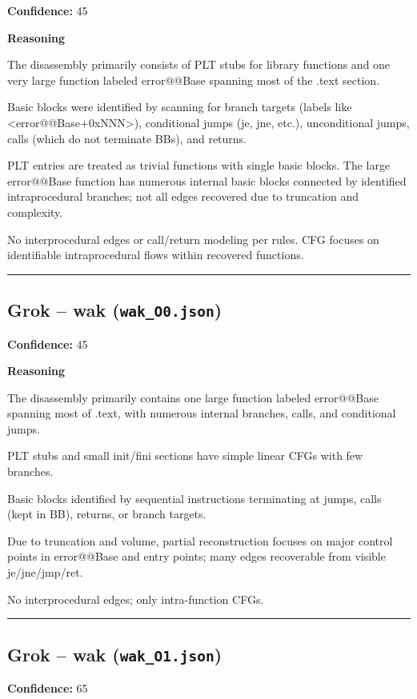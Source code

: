 \textbf{Confidence:} 45

\textbf{Reasoning}

The disassembly primarily consists of PLT stubs for library functions and one very large function labeled error@@Base spanning most of the .text section.

Basic blocks were identified by scanning for branch targets (labels like <error@@Base+0xNNN>), conditional jumps (je, jne, etc.), unconditional jumps, calls (which do not terminate BBs), and returns.

PLT entries are treated as trivial functions with single basic blocks. The large error@@Base function has numerous internal basic blocks connected by identified intraprocedural branches; not all edges recovered due to truncation and complexity.

No interprocedural edges or call/return modeling per rules. CFG focuses on identifiable intraprocedural flows within recovered functions.

\bigskip
\hrule
\bigskip

\subsection{Grok -- wak (\texttt{wak\_O0.json})}

\textbf{Confidence:} 45

\textbf{Reasoning}

The disassembly primarily contains one large function labeled error@@Base spanning most of .text, with numerous internal branches, calls, and conditional jumps.

PLT stubs and small init/fini sections have simple linear CFGs with few branches.

Basic blocks identified by sequential instructions terminating at jumps, calls (kept in BB), returns, or branch targets.

Due to truncation and volume, partial reconstruction focuses on major control points in error@@Base and entry points; many edges recoverable from visible je/jne/jmp/ret.

No interprocedural edges; only intra-function CFGs.

\bigskip
\hrule
\bigskip

\subsection{Grok -- wak (\texttt{wak\_O1.json})}

\textbf{Confidence:} 65

